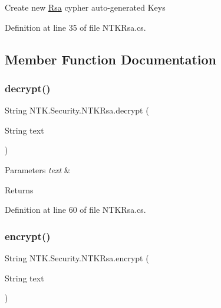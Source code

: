 Create new \mbox{\hyperlink{class_n_t_k_1_1_security_1_1_rsa}{Rsa}} cypher auto-\/generated Keys 



Definition at line 35 of file N\+T\+K\+Rsa.\+cs.



\subsection{Member Function Documentation}
\mbox{\label{class_n_t_k_1_1_security_1_1_n_t_k_rsa_a14aece6cdb625bacfdc1c0118e93f7e2}} 
\subsubsection{\texorpdfstring{decrypt()}{decrypt()}}
{\footnotesize\ttfamily String N\+T\+K.\+Security.\+N\+T\+K\+Rsa.\+decrypt (\begin{DoxyParamCaption}\item[{String}]{text }\end{DoxyParamCaption})}






\begin{DoxyParams}{Parameters}
{\em text} & \\
\hline
\end{DoxyParams}
\begin{DoxyReturn}{Returns}

\end{DoxyReturn}


Definition at line 60 of file N\+T\+K\+Rsa.\+cs.

\mbox{\label{class_n_t_k_1_1_security_1_1_n_t_k_rsa_a855354d25d5a6bca73a81f36eec4cc06}} 
\subsubsection{\texorpdfstring{encrypt()}{encrypt()}}
{\footnotesize\ttfamily String N\+T\+K.\+Security.\+N\+T\+K\+Rsa.\+encrypt (\begin{DoxyParamCaption}\item[{String}]{text }\end{DoxyParamCaption})}






